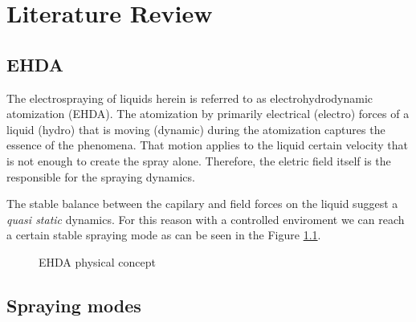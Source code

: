 \chapter{Literature Review}
\label{chap:lit_review}


\section{EHDA}
\label{sec:ehda_resume}

The electrospraying of liquids herein is referred to as electrohydrodynamic atomization (EHDA). The atomization by primarily electrical (electro) forces of a liquid (hydro) that is moving (dynamic) during the atomization captures the essence of the phenomena.\cite{Grace}
That motion applies to the liquid certain velocity that is not enough to create the spray alone. Therefore, the eletric field itself is the responsible for the spraying dynamics.\cite{prunet}

The stable balance between the capilary and field forces on the liquid suggest a \emph{quasi static} dynamics.
For this reason with a controlled enviroment we can reach a certain stable spraying mode as can be seen in the Figure \ref{fig:ehda_setup_ex2}.

\begin{figure}[H]
  \centering
  \caption{EHDA physical concept \cite{Gabriel}}
  \label{fig:ehda_setup_ex2}
\end{figure}


\section{Spraying modes}
\label{sec:spraying_modes_subsec}

